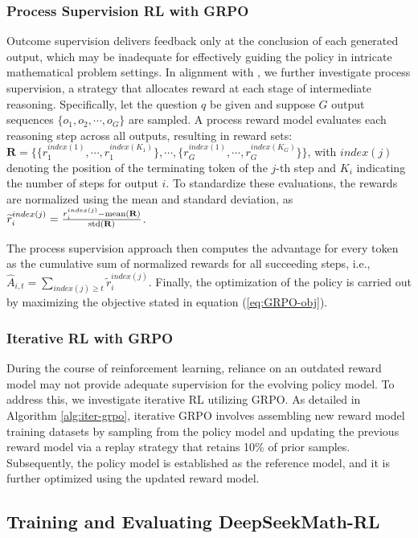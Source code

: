 \begin{itemize}[topsep=0pt]
\begin{itemize}[topsep=0pt]
\subsubsection{Process Supervision RL with GRPO} Outcome supervision delivers feedback only at the conclusion of each generated output, which may be inadequate for effectively guiding the policy in intricate mathematical problem settings. In alignment with \cite{wang2023math}, we further investigate process supervision, a strategy that allocates reward at each stage of intermediate reasoning. Specifically, let the question $q$ be given and suppose $G$ output sequences $\{o_1, o_2, \cdots, o_G\}$ are sampled. A process reward model evaluates each reasoning step across all outputs, resulting in reward sets: $\mathbf{R} = \{ \{r_1^{index(1)},\cdots,r_1^{index(K_1)}\}, \cdots,  \{r_G^{index(1)},\cdots,r_G^{index(K_G)}\} \}$, with $index(j)$ denoting the position of the terminating token of the $j$-th step and $K_i$ indicating the number of steps for output $i$. To standardize these evaluations, the rewards are normalized using the mean and standard deviation, as $\widetilde{r}_i^{index(j)} = \frac{r_i^{index(j)} - {\rm mean(\mathbf{R})}}{{\rm std(\mathbf{R})}}$.

The process supervision approach then computes the advantage for every token as the cumulative sum of normalized rewards for all succeeding steps, i.e., $\hat{A}_{i, t} = \sum_{index(j) \ge t} \widetilde{r}_i^{index(j)}$.
Finally, the optimization of the policy is carried out by maximizing the objective stated in equation (\ref{eq:GRPO-obj}).

\subsubsection{Iterative RL with GRPO} During the course of reinforcement learning, reliance on an outdated reward model may not provide adequate supervision for the evolving policy model. To address this, we investigate iterative RL utilizing GRPO. As detailed in Algorithm \ref{alg:iter-grpo}, iterative GRPO involves assembling new reward model training datasets by sampling from the policy model and updating the previous reward model via a replay strategy that retains 10\% of prior samples. Subsequently, the policy model is established as the reference model, and it is further optimized using the updated reward model.

\subsection{Training and Evaluating DeepSeekMath-RL}


\end{itemize}
\end{itemize}
